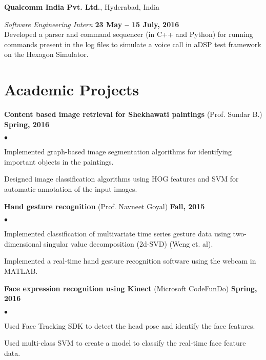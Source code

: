 \documentclass[margin,line]{res}
\newenvironment{list2}{
  \begin{list}{$\bullet$}{%
      \setlength{\itemsep}{0in}
      \setlength{\parsep}{0in} \setlength{\parskip}{0in}
      \setlength{\topsep}{0in} \setlength{\partopsep}{0in} 
      \setlength{\leftmargin}{0.2in}}}{\end{list}}
\begin{document}
\begin{resume}
{\bf Qualcomm India Pvt. Ltd.}, Hyderabad, India

\vspace{-.3cm}
{\em Software Engineering Intern} \hfill {\bf 23 May -- 15 July, 2016}\\
Developed a parser and command sequencer (in C++ and Python) for running commands present in the log files to simulate a voice call in aDSP test framework on the Hexagon Simulator.

\section{\sc Academic Projects}

{\bf Content based image retrieval for Shekhawati paintings} (Prof. Sundar B.) \hfill {\bf Spring, 2016}

\vspace*{.2cm}
\begin{list2}
\item Implemented graph-based image segmentation algorithms for identifying important objects in the paintings.
\item Designed image classification algorithms using HOG features and SVM for automatic annotation of the input images.	
\end{list2}

{\bf Hand gesture recognition} (Prof. Navneet Goyal) \hfill {\bf Fall, 2015}

\vspace*{.2cm}
\begin{list2}
\item Implemented classification of multivariate time series gesture data using two-dimensional singular value decomposition (2d-SVD) (Weng et. al).
\item Implemented a real-time hand gesture recognition software using the webcam in MATLAB.	
\end{list2}

{\bf Face expression recognition using Kinect} (Microsoft CodeFunDo) \hfill {\bf Spring, 2016}

\vspace*{.2cm}
\begin{list2}
\item Used Face Tracking SDK to detect the head pose and identify the face features.
\item Used multi-class SVM to create a model to classify the real-time face feature data.
\end{list2}


\end{resume}
\end{document}
